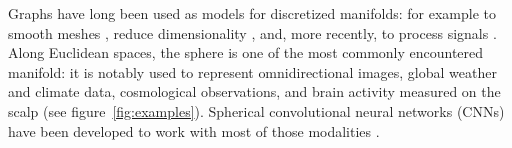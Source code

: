\documentclass{article} %
\newcommand{\figref}[1]{figure~\ref{fig:#1}}
\newcommand{\1}{\b{1}}              %
\newcommand{\0}{\b{0}}              %
\newcommand{\todo}[1]{{\color[rgb]{.6,.1,.6}{#1}}}
\begin{document}



Graphs have long been used as models for discretized manifolds: for example to smooth meshes \citep{taubin1996meshsmoothing}, reduce dimensionality \citep{belkin2003laplacian}, and, more recently, to process signals \citep{shuman2013gsp}.
Along
Euclidean spaces, the sphere is one of the most commonly encountered manifold: it is notably used to represent omnidirectional images, global weather and climate data, cosmological observations, and brain activity measured on the scalp (see \figref{examples}).
Spherical convolutional neural networks (CNNs) have been developed to work with most of those modalities \citep{cohen2018sphericalcnn, esteves2017sphericalcnn, perraudin2018deepsphere, khasanova2017graphomni, boomsma2017sphericalcnn, su2017sphericalcnn, coors2018sphericalcnn,
jiang2019sphericalcnn}.
\end{document}
